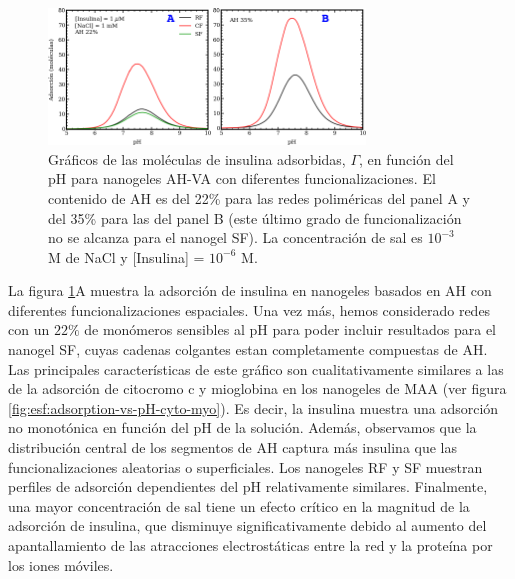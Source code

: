 \begin{figure}[!htb]
    \centering
    \includegraphics[width=0.75\textwidth]{Figures/graphs-gel2/insu-PAH.pdf}
    \caption{Gr\'aficos de las mol\'eculas de insulina adsorbidas, $\Gamma$, en funci\'on del pH para nanogeles AH-VA con diferentes funcionalizaciones.
    	El contenido de AH es del 22\% para las redes polim\'ericas del panel A y del 35\% para las del panel B (este \'ultimo grado de funcionalizaci\'on no se alcanza para el nanogel SF).
    	 La concentraci\'on de sal es $10^{-3}$ M de NaCl y [Insulina] = $10^{-6}$ M.}
    \label{fig:esf:adsorption-vs-pH-insulin}
\end{figure}




La figura \ref{fig:esf:adsorption-vs-pH-insulin}A muestra la adsorci\'on de insulina en nanogeles basados en AH con diferentes funcionalizaciones espaciales.
Una vez m\'as, hemos considerado redes con un $22\%$ de mon\'omeros sensibles al pH para poder incluir resultados para el nanogel SF, cuyas cadenas colgantes estan completamente compuestas  de AH. 
Las principales caracter\'isticas de este gr\'afico son cualitativamente similares a las de la adsorci\'on de citocromo c y mioglobina en los nanogeles de MAA (ver figura \ref{fig:esf:adsorption-vs-pH-cyto-myo}).
Es decir, la insulina muestra una adsorci\'on no monot\'onica en funci\'on del pH de la soluci\'on.
Adem\'as, observamos que la distribuci\'on central de los segmentos de AH captura m\'as insulina que las funcionalizaciones aleatorias o superficiales.
Los nanogeles RF y SF muestran perfiles de adsorci\'on dependientes del pH relativamente similares.
Finalmente, una mayor concentraci\'on de sal tiene un efecto cr\'itico en la magnitud de la adsorci\'on de insulina, que disminuye significativamente debido al aumento del apantallamiento de las atracciones electrost\'aticas entre la red y la prote\'ina por los iones m\'oviles.

